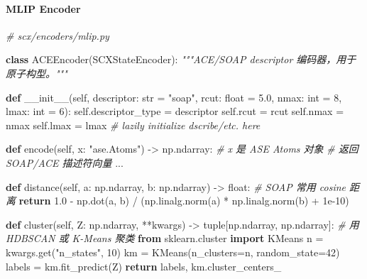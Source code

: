 \documentclass[
  12pt,
]{ctexart}
\newenvironment{Shaded}{}{}
\newcommand{\BuiltInTok}[1]{\textcolor[rgb]{0.00,0.50,0.00}{#1}}
\newcommand{\CommentTok}[1]{\textcolor[rgb]{0.38,0.63,0.69}{\textit{#1}}}
\newcommand{\ControlFlowTok}[1]{\textcolor[rgb]{0.00,0.44,0.13}{\textbf{#1}}}
\newcommand{\DecValTok}[1]{\textcolor[rgb]{0.25,0.63,0.44}{#1}}
\newcommand{\FloatTok}[1]{\textcolor[rgb]{0.25,0.63,0.44}{#1}}
\newcommand{\FunctionTok}[1]{\textcolor[rgb]{0.02,0.16,0.49}{#1}}
\newcommand{\ImportTok}[1]{\textcolor[rgb]{0.00,0.50,0.00}{\textbf{#1}}}
\newcommand{\KeywordTok}[1]{\textcolor[rgb]{0.00,0.44,0.13}{\textbf{#1}}}
\newcommand{\NormalTok}[1]{#1}
\newcommand{\OperatorTok}[1]{\textcolor[rgb]{0.40,0.40,0.40}{#1}}
\newcommand{\StringTok}[1]{\textcolor[rgb]{0.25,0.44,0.63}{#1}}
\newcommand{\VariableTok}[1]{\textcolor[rgb]{0.10,0.09,0.49}{#1}}
\begin{document}
\paragraph{MLIP Encoder}\label{mlip-encoder}

\begin{Shaded}
\begin{Highlighting}[]
\CommentTok{\# scx/encoders/mlip.py}

\KeywordTok{class}\NormalTok{ ACEEncoder(SCXStateEncoder):}
    \CommentTok{"""ACE/SOAP descriptor 编码器，用于原子构型。"""}

    \KeywordTok{def} \FunctionTok{\_\_init\_\_}\NormalTok{(}\VariableTok{self}\NormalTok{, descriptor: }\BuiltInTok{str} \OperatorTok{=} \StringTok{"soap"}\NormalTok{, rcut: }\BuiltInTok{float} \OperatorTok{=} \FloatTok{5.0}\NormalTok{, nmax: }\BuiltInTok{int} \OperatorTok{=} \DecValTok{8}\NormalTok{, lmax: }\BuiltInTok{int} \OperatorTok{=} \DecValTok{6}\NormalTok{):}
        \VariableTok{self}\NormalTok{.descriptor\_type }\OperatorTok{=}\NormalTok{ descriptor}
        \VariableTok{self}\NormalTok{.rcut }\OperatorTok{=}\NormalTok{ rcut}
        \VariableTok{self}\NormalTok{.nmax }\OperatorTok{=}\NormalTok{ nmax}
        \VariableTok{self}\NormalTok{.lmax }\OperatorTok{=}\NormalTok{ lmax}
        \CommentTok{\# lazily initialize dscribe/etc. here}

    \KeywordTok{def}\NormalTok{ encode(}\VariableTok{self}\NormalTok{, x: }\StringTok{"ase.Atoms"}\NormalTok{) }\OperatorTok{{-}\textgreater{}}\NormalTok{ np.ndarray:}
        \CommentTok{\# x 是 ASE Atoms 对象}
        \CommentTok{\# 返回 SOAP/ACE 描述符向量}
\NormalTok{        ...}

    \KeywordTok{def}\NormalTok{ distance(}\VariableTok{self}\NormalTok{, a: np.ndarray, b: np.ndarray) }\OperatorTok{{-}\textgreater{}} \BuiltInTok{float}\NormalTok{:}
        \CommentTok{\# SOAP 常用 cosine 距离}
        \ControlFlowTok{return} \FloatTok{1.0} \OperatorTok{{-}}\NormalTok{ np.dot(a, b) }\OperatorTok{/}\NormalTok{ (np.linalg.norm(a) }\OperatorTok{*}\NormalTok{ np.linalg.norm(b) }\OperatorTok{+} \FloatTok{1e{-}10}\NormalTok{)}

    \KeywordTok{def}\NormalTok{ cluster(}\VariableTok{self}\NormalTok{, Z: np.ndarray, }\OperatorTok{**}\NormalTok{kwargs) }\OperatorTok{{-}\textgreater{}} \BuiltInTok{tuple}\NormalTok{[np.ndarray, np.ndarray]:}
        \CommentTok{\# 用 HDBSCAN 或 K{-}Means 聚类}
        \ImportTok{from}\NormalTok{ sklearn.cluster }\ImportTok{import}\NormalTok{ KMeans}
\NormalTok{        n }\OperatorTok{=}\NormalTok{ kwargs.get(}\StringTok{"n\_states"}\NormalTok{, }\DecValTok{10}\NormalTok{)}
\NormalTok{        km }\OperatorTok{=}\NormalTok{ KMeans(n\_clusters}\OperatorTok{=}\NormalTok{n, random\_state}\OperatorTok{=}\DecValTok{42}\NormalTok{)}
\NormalTok{        labels }\OperatorTok{=}\NormalTok{ km.fit\_predict(Z)}
        \ControlFlowTok{return}\NormalTok{ labels, km.cluster\_centers\_}
\end{Highlighting}
\end{Shaded}
\end{document}
